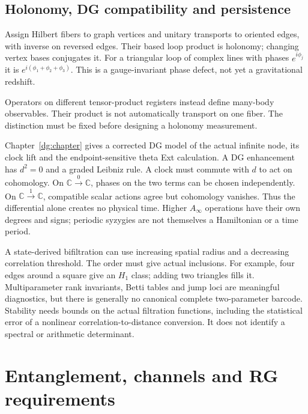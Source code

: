 \documentclass[11pt,oneside,openany]{book}
\theoremstyle{definition}\newtheorem{definition}[theorem]{Definition}
\theoremstyle{remark}\newtheorem{remark}[theorem]{Remark}
\newcommand{\C}{\mathbb C}\newcommand{\Z}{\mathbb Z}\newcommand{\R}{\mathbb R}
\begin{document}
\section{Holonomy, DG compatibility and persistence}
Assign Hilbert fibers to graph vertices and unitary transports to oriented
edges, with inverse on reversed edges. Their based loop product is holonomy;
changing vertex bases conjugates it. For a triangular loop of complex lines
with phases $e^{i\phi_j}$ it is $e^{i(\phi_1+\phi_2+\phi_3)}$.
This is a gauge-invariant phase defect, not yet a gravitational redshift.
\begin{center}
\end{center}
Operators on different tensor-product registers instead define many-body
observables. Their product is not automatically transport on one fiber.
The distinction must be fixed before designing a holonomy measurement.

Chapter~\ref{dg:chapter} gives a corrected DG model of the actual infinite
node, its clock lift and the endpoint-sensitive theta Ext calculation.
A DG enhancement has $d^2=0$ and a graded Leibniz rule. A clock must
commute with $d$ to act on cohomology. On $\C\xrightarrow{0}\C$, phases
on the two terms can be chosen independently. On
$\C\xrightarrow{1}\C$, compatible scalar actions agree but cohomology
vanishes. Thus the differential alone creates no physical time. Higher
$A_\infty$ operations have their own degrees and signs; periodic syzygies
are not themselves a Hamiltonian or a time period.

A state-derived bifiltration can use increasing spatial radius and a
decreasing correlation threshold. The order must give actual inclusions.
For example, four edges around a square give an $H_1$ class; adding two
triangles fills it. Multiparameter rank invariants, Betti tables and jump
loci are meaningful diagnostics, but there is generally no canonical
complete two-parameter barcode. Stability needs bounds on the actual
filtration functions, including the statistical error of a nonlinear
correlation-to-distance conversion. It does not identify a spectral or
arithmetic determinant.

\chapter{Entanglement, channels and RG requirements}
\label{phys:learning}
\end{document}

